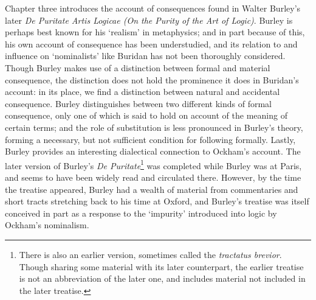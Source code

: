 \documentclass[]{article}
\begin{document}
Chapter three introduces the account of consequences found in Walter Burley's later \textit{De Puritate Artis Logicae (On the Purity of the Art of Logic)}. Burley is perhaps best known for his `realism' in metaphysics; and in part because of this, his own account of consequence has been understudied, and its relation to and influence on `nominalists' like Buridan has not been thoroughly considered. Though Burley makes use of a distinction between formal and material consequence, the distinction does not hold the prominence it does in Buridan's account: in its place, we find a distinction between natural and accidental consequence. Burley distinguishes between two different kinds of formal consequence, only one of which is said to hold on account of the meaning of certain terms; and the role of substitution is less pronounced in Burley's theory, forming a necessary, but not sufficient condition for following formally. Lastly, Burley provides an interesting dialectical connection to Ockham's account. The later version of Burley's \textit{De Puritate}\footnote{There is also an earlier version, sometimes called the \textit{tractatus brevior}. Though sharing some material with its later counterpart, the earlier treatise is not an abbreviation of the later one, and includes material not included in the later treatise.} was completed while Burley was at Paris, and seems to have been widely read and circulated there. However, by the time the treatise appeared, Burley had a wealth of material from commentaries and short tracts stretching back to his time at Oxford, and Burley's treatise was itself conceived in part as a response to the `impurity' introduced into logic by Ockham's nominalism. 
\end{document}
